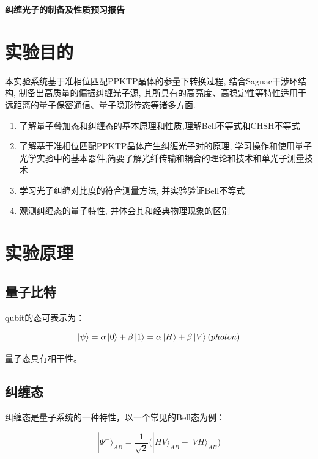 \documentclass[a4paper,UTF8]{ctexart}
\begin{document}
\begin{center}
    \textbf{\Large 纠缠光子的制备及性质预习报告}
    \par {}
\end{center}

\section{实验目的}

本实验系统基于准相位匹配PPKTP晶体的参量下转换过程, 结合Sagnac干涉环结构, 制备出高质量的偏振纠缠光子源, 其所具有的高亮度、高稳定性等特性适用于远距离的量子保密通信、量子隐形传态等诸多方面.

\begin{enumerate}
    \item 了解量子叠加态和纠缠态的基本原理和性质,理解Bell不等式和CHSH不等式
    \item 了解基于准相位匹配PPKTP晶体产生纠缠光子对的原理, 学习操作和使用量子光学实验中的基本器件;简要了解光纤传输和耦合的理论和技术和单光子测量技术
    \item 学习光子纠缠对比度的符合测量方法, 并实验验证Bell不等式
    \item 观测纠缠态的量子特性, 并体会其和经典物理现象的区别
\end{enumerate}

\section{实验原理}

\subsection{量子比特}

qubit的态可表示为：

\begin{equation}
    \ket{\psi} = \alpha \ket{0} + \beta \ket{1} = \alpha \ket{H} + \beta\ket{V} (photon)
\end{equation}

量子态具有相干性。

\subsection{纠缠态}

纠缠态是量子系统的一种特性，以一个常见的Bell态为例：

\begin{equation}|\Psi^-\rangle_{AB}=\frac{1}{\sqrt{2}}\big(|HV\rangle_{AB}-|VH\rangle_{AB}\big)\end{equation}
\end{document}

